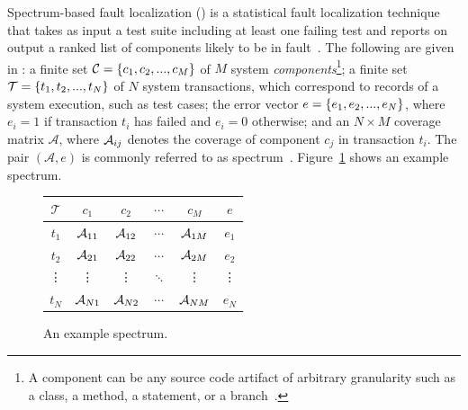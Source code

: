 \documentclass[sigplan,10pt,review,anonymous]{acmart}\settopmatter{printfolios=true,printccs=false,printacmref=false}
\begin{document}
Spectrum-based fault localization (\sfl) is a statistical fault
localization technique that takes as input a test suite including at
least one failing test and reports on output a ranked list of
components likely to be in fault~\cite{FLSurvey2016,
  DBLP:conf/kbse/JonesH05, DBLP:journals/smr/LuciaLJTB14,
  DBLP:journals/jss/AbreuZGG09}. The following are given in \sfl{}: a
finite set $\mathcal{C} = \{{}c_1,c_2,...,c_M\}$ of $M$ system
\emph{components}\footnote{A component can be any source code artifact
  of arbitrary granularity such as a class, a method, a statement, or
  a branch~\cite{DBLP:journals/stvr/HarroldRSWY00}.}; a finite set
$\mathcal{T} = \{{}t_1,t_2,...,t_N\}$ of $N$ system transactions,
which correspond to records of a system execution, such as test cases;
the error vector $e = \{{}e_1,e_2,...,e_N\}$, where $e_i = 1$ if
transaction $t_i$ has failed and $e_i = 0$ otherwise; and an $N \times
M$ coverage matrix $\mathcal{A}$, where $\mathcal{A}_{ij}$ denotes the coverage
of component $c_j$ in transaction $t_i$.  The pair $(\mathcal{A},e)$
is commonly referred to as
spectrum~\cite{DBLP:journals/stvr/HarroldRSWY00}. Figure~\ref{fig:spectrum-example}
shows an example spectrum.
\begin{figure}
  \vspace{-2ex}
  \hspace{-3ex}
  \centering
  \small
  \begin{tabular}{c|cccc|c}
    $\mathcal{T}$ & $c_1$    & $c_2$    & $\cdots$ & $c_M$    & $e$    \\ \hline
    $t_1$         & $\mathcal{A}_{11}$ & $\mathcal{A}_{12}$ & $\cdots$ & $\mathcal{A}_{1M}$ & $e_1$  \\
    $t_2$         & $\mathcal{A}_{21}$ & $\mathcal{A}_{22}$ & $\cdots$ & $\mathcal{A}_{2M}$ & $e_2$  \\
    \vdots        & \vdots   & \vdots   & $\ddots$ & \vdots   & \vdots \\
    $t_N$         & $\mathcal{A}_{N1}$ & $\mathcal{A}_{N2}$ & $\cdots$ & $\mathcal{A}_{NM}$ & $e_N$  \\
  \end{tabular}
  \caption{An example spectrum.}
  \label{fig:spectrum-example}
\end{figure}
\end{document}
